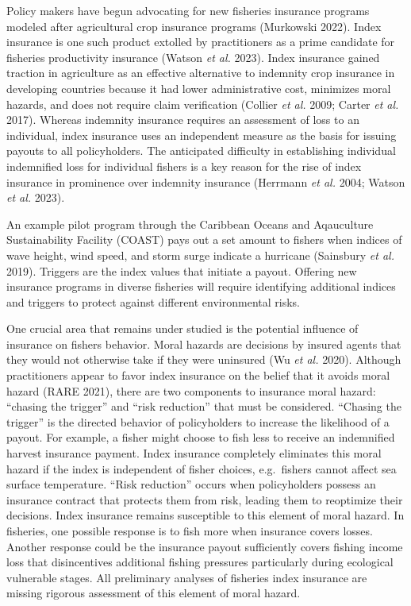 \documentclass[
  letterpaper,
  DIV=11,
  numbers=noendperiod]{scrartcl}
\theoremstyle{plain}
\theoremstyle{plain}
\theoremstyle{remark}
\begin{document}
Policy makers have begun advocating for new fisheries insurance programs
modeled after agricultural crop insurance programs (Murkowski 2022).
Index insurance is one such product extolled by practitioners as a prime
candidate for fisheries productivity insurance (Watson \emph{et al.}
2023). Index insurance gained traction in agriculture as an effective
alternative to indemnity crop insurance in developing countries because
it had lower administrative cost, minimizes moral hazards, and does not
require claim verification (Collier \emph{et al.} 2009; Carter \emph{et
al.} 2017). Whereas indemnity insurance requires an assessment of loss
to an individual, index insurance uses an independent measure as the
basis for issuing payouts to all policyholders. The anticipated
difficulty in establishing individual indemnified loss for individual
fishers is a key reason for the rise of index insurance in prominence
over indemnity insurance (Herrmann \emph{et al.} 2004; Watson \emph{et
al.} 2023).

An example pilot program through the Caribbean Oceans and Aqauculture
Sustainability Facility (COAST) pays out a set amount to fishers when
indices of wave height, wind speed, and storm surge indicate a hurricane
(Sainsbury \emph{et al.} 2019). Triggers are the index values that
initiate a payout. Offering new insurance programs in diverse fisheries
will require identifying additional indices and triggers to protect
against different environmental risks.

One crucial area that remains under studied is the potential influence
of insurance on fishers behavior. Moral hazards are decisions by insured
agents that they would not otherwise take if they were uninsured (Wu
\emph{et al.} 2020). Although practitioners appear to favor index
insurance on the belief that it avoids moral hazard (RARE 2021), there
are two components to insurance moral hazard: ``chasing the trigger''
and ``risk reduction'' that must be considered. ``Chasing the trigger''
is the directed behavior of policyholders to increase the likelihood of
a payout. For example, a fisher might choose to fish less to receive an
indemnified harvest insurance payment. Index insurance completely
eliminates this moral hazard if the index is independent of fisher
choices, e.g.~fishers cannot affect sea surface temperature. ``Risk
reduction'' occurs when policyholders possess an insurance contract that
protects them from risk, leading them to reoptimize their decisions.
Index insurance remains susceptible to this element of moral hazard. In
fisheries, one possible response is to fish more when insurance covers
losses. Another response could be the insurance payout sufficiently
covers fishing income loss that disincentives additional fishing
pressures particularly during ecological vulnerable stages. All
preliminary analyses of fisheries index insurance are missing rigorous
assessment of this element of moral hazard.
\end{document}

